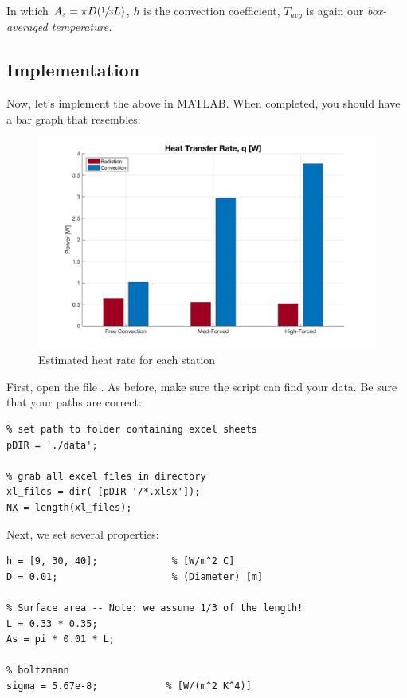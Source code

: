 \documentclass[11pt, letterpaper]{article}
\begin{document}
\n
In which $ A_s = \pi D ( \sfrac{1}{3} L )$, $h$ is the convection coefficient, $T_{avg}$ is again our \it{box-averaged} temperature. 

\n
\subsection{Implementation}

Now, let's implement the above in MATLAB. When completed, you should have a bar graph that resembles:

\begin{figure}[H]
    \begin{center}
        \includegraphics[width=120mm]{gfx/rad_estimation.png}
    \caption{Estimated heat rate for each station}\label{fig5}
    \end{center}
\end{figure}

\n
First, open the file . As before, make sure the script can find your data. Be sure that your paths are correct:

\begin{lstlisting}[numbers=none]
%% SETUP
% set path to folder containing excel sheets
pDIR = './data';

% grab all excel files in directory
xl_files = dir( [pDIR '/*.xlsx']);
NX = length(xl_files);
\end{lstlisting}
\n
Next, we set several properties:

\begin{lstlisting}[numbers=none]
% Fin Properties 
h = [9, 30, 40];             % [W/m^2 C]
D = 0.01;                    % (Diameter) [m]

% Surface area -- Note: we assume 1/3 of the length!
L = 0.33 * 0.35;
As = pi * 0.01 * L;

% boltzmann
sigma = 5.67e-8;            % [W/(m^2 K^4)]
\end{lstlisting}
\end{document}
